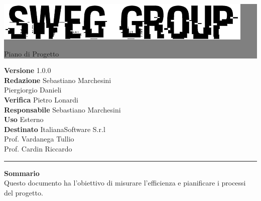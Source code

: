 \documentclass[12pt,a4paper,titlepage]{article}
\newcommand{\HRule}[1]{\hfill \rule{0.2\linewidth}{#1}} %
\begin{document}
	
	\thispagestyle{empty} %
	
	
	\colorbox{grey}{
		\parbox[t]{1.0\linewidth}{
			\centering \fontsize{50pt}{80pt}\selectfont %
			\vspace*{0.7cm} %
			
			\raggedleft
			\includegraphics[width=0.7\linewidth]{../../LogoSWEgGroupSFONDOVUOTO}
			
			\hfill Piano di Progetto \\
			
			\vspace*{0.7cm} %
		}
	}
	
	
	\vfill %
	
	
	{\centering \large 
		\hfill \textbf{Versione} 1.0.0 \\
		\hfill \textbf{Redazione} Sebastiano Marchesini \\
		\hfill Piergiorgio Danieli \\
		\hfill \textbf{Verifica} Pietro Lonardi  \\
		\hfill \textbf{Responsabile} Sebastiano Marchesini \\
		\hfill \textbf{Uso} Esterno \\
		\hfill \textbf{Destinato} ItalianaSoftware S.r.l \\
		\hfill Prof. Vardanega Tullio \\
		\hfill Prof. Cardin Riccardo \\ 
		
		\HRule{1pt}
		
		\textbf{Sommario} \\
		Questo documento ha l'obiettivo di misurare l'efficienza e pianificare i processi del progetto.
		
	} %
	
\end{document}
